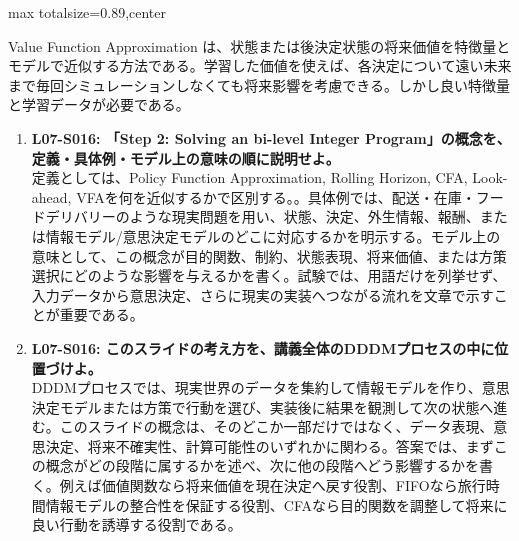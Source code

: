 \begin{minipage}[t]{0.58\textwidth}
\begin{adjustbox}{max totalsize={\textwidth}{0.89\textheight},center}
\begin{minipage}{\textwidth}
Value Function Approximation は、状態または後決定状態の将来価値を特徴量とモデルで近似する方法である。学習した価値を使えば、各決定について遠い未来まで毎回シミュレーションしなくても将来影響を考慮できる。しかし良い特徴量と学習データが必要である。\par{}\begin{enumerate}\item \textbf{L07-S016: 「Step 2: Solving an bi-level Integer Program」の概念を、定義・具体例・モデル上の意味の順に説明せよ。}\\定義としては、Policy Function Approximation, Rolling Horizon, CFA, Look-ahead, VFAを何を近似するかで区別する。。具体例では、配送・在庫・フードデリバリーのような現実問題を用い、状態、決定、外生情報、報酬、または情報モデル/意思決定モデルのどこに対応するかを明示する。モデル上の意味として、この概念が目的関数、制約、状態表現、将来価値、または方策選択にどのような影響を与えるかを書く。試験では、用語だけを列挙せず、入力データから意思決定、さらに現実の実装へつながる流れを文章で示すことが重要である。\item \textbf{L07-S016: このスライドの考え方を、講義全体のDDDMプロセスの中に位置づけよ。}\\DDDMプロセスでは、現実世界のデータを集約して情報モデルを作り、意思決定モデルまたは方策で行動を選び、実装後に結果を観測して次の状態へ進む。このスライドの概念は、そのどこか一部だけではなく、データ表現、意思決定、将来不確実性、計算可能性のいずれかに関わる。答案では、まずこの概念がどの段階に属するかを述べ、次に他の段階へどう影響するかを書く。例えば価値関数なら将来価値を現在決定へ戻す役割、FIFOなら旅行時間情報モデルの整合性を保証する役割、CFAなら目的関数を調整して将来に良い行動を誘導する役割である。\end{enumerate}
\end{minipage}
\end{adjustbox}
\end{minipage}


